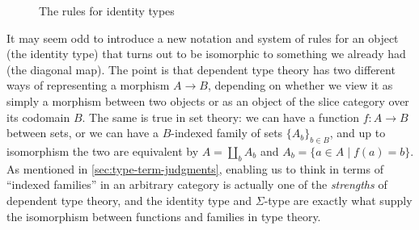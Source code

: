 \documentclass[12pt]{article}
\let\jdeq\equiv
\def\ty{\;\mathsf{type}}
\def\refl{\mathsf{refl}}
\def\J{\mathsf{J}}
\def\types{\vdash}
\def\equiv{\mathsf{Equiv}}
\numberwithin{equation}{section}
\begin{document}
\begin{figure}
  \centering
\caption{The rules for identity types}
\label{fig:id}
\end{figure}

It may seem odd to introduce a new notation and system of rules for an object (the identity type) that turns out to be isomorphic to something we already had (the diagonal map).
The point is that dependent type theory has two different ways of representing a morphism $A\to B$, depending on whether we view it as simply a morphism between two objects or as an object of the slice category over its codomain $B$.
The same is true in set theory: we can have a function $f:A\to B$ between sets, or we can have a $B$-indexed family of sets $\{A_b\}_{b\in B}$, and up to isomorphism the two are equivalent by $A= \coprod_b A_b$ and $A_b = \{ a\in A \mid f(a)=b \}$.
As mentioned in \cref{sec:type-term-judgments}, enabling us to think in terms of ``indexed families'' in an arbitrary category is actually one of the \emph{strengths} of dependent type theory, and
the identity type and $\Sigma$-type are exactly what supply the isomorphism between functions and families in type theory. %
\end{document}
